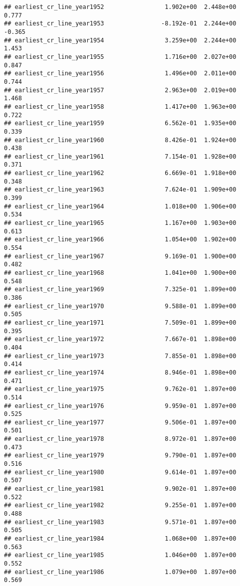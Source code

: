 \documentclass[]{article}
\begin{document}
\begin{verbatim}
## earliest_cr_line_year1952                 1.902e+00  2.448e+00    0.777
## earliest_cr_line_year1953                -8.192e-01  2.244e+00   -0.365
## earliest_cr_line_year1954                 3.259e+00  2.244e+00    1.453
## earliest_cr_line_year1955                 1.716e+00  2.027e+00    0.847
## earliest_cr_line_year1956                 1.496e+00  2.011e+00    0.744
## earliest_cr_line_year1957                 2.963e+00  2.019e+00    1.468
## earliest_cr_line_year1958                 1.417e+00  1.963e+00    0.722
## earliest_cr_line_year1959                 6.562e-01  1.935e+00    0.339
## earliest_cr_line_year1960                 8.426e-01  1.924e+00    0.438
## earliest_cr_line_year1961                 7.154e-01  1.928e+00    0.371
## earliest_cr_line_year1962                 6.669e-01  1.918e+00    0.348
## earliest_cr_line_year1963                 7.624e-01  1.909e+00    0.399
## earliest_cr_line_year1964                 1.018e+00  1.906e+00    0.534
## earliest_cr_line_year1965                 1.167e+00  1.903e+00    0.613
## earliest_cr_line_year1966                 1.054e+00  1.902e+00    0.554
## earliest_cr_line_year1967                 9.169e-01  1.900e+00    0.482
## earliest_cr_line_year1968                 1.041e+00  1.900e+00    0.548
## earliest_cr_line_year1969                 7.325e-01  1.899e+00    0.386
## earliest_cr_line_year1970                 9.588e-01  1.899e+00    0.505
## earliest_cr_line_year1971                 7.509e-01  1.899e+00    0.395
## earliest_cr_line_year1972                 7.667e-01  1.898e+00    0.404
## earliest_cr_line_year1973                 7.855e-01  1.898e+00    0.414
## earliest_cr_line_year1974                 8.946e-01  1.898e+00    0.471
## earliest_cr_line_year1975                 9.762e-01  1.897e+00    0.514
## earliest_cr_line_year1976                 9.959e-01  1.897e+00    0.525
## earliest_cr_line_year1977                 9.506e-01  1.897e+00    0.501
## earliest_cr_line_year1978                 8.972e-01  1.897e+00    0.473
## earliest_cr_line_year1979                 9.790e-01  1.897e+00    0.516
## earliest_cr_line_year1980                 9.614e-01  1.897e+00    0.507
## earliest_cr_line_year1981                 9.902e-01  1.897e+00    0.522
## earliest_cr_line_year1982                 9.255e-01  1.897e+00    0.488
## earliest_cr_line_year1983                 9.571e-01  1.897e+00    0.505
## earliest_cr_line_year1984                 1.068e+00  1.897e+00    0.563
## earliest_cr_line_year1985                 1.046e+00  1.897e+00    0.552
## earliest_cr_line_year1986                 1.079e+00  1.897e+00    0.569

\end{verbatim}
\end{document}
